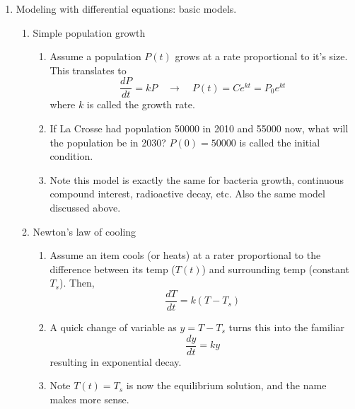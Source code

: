 \documentclass{article}
\begin{document}
\begin{enumerate}
\item Modeling with differential equations: basic models.
\begin{enumerate}

\item Simple population growth
\begin{enumerate}
\item Assume a population $P(t)$ grows at a rate proportional to it's size. This translates to
\[
\frac{dP}{dt} = k P \quad \rightarrow \quad P(t) = Ce^{kt} = P_0 e^{kt}
\]
where $k$ is called the growth rate.
\item If La Crosse had population 50000 in 2010 and 55000 now, what will the population be in 2030? $P(0)=50000$ is called the initial condition.
\item Note this model is exactly the same for bacteria growth, continuous compound interest, radioactive decay, etc. Also the same model discussed above.
\end{enumerate}
\item Newton's law of cooling
\begin{enumerate}
\item Assume an item cools (or heats) at a rater proportional to the difference between its temp ($T(t)$) and surrounding temp (constant $T_s$). Then,
\[
\frac{dT}{dt} = k(T-T_s)
\]
\item A quick change of variable as $y=T-T_s$ turns this into the familiar
\[
\frac{dy}{dt}=ky
\]
resulting in exponential decay.
\item Note $T(t)=T_s$ is now the equilibrium solution, and the name makes more sense.
\end{enumerate}


\end{enumerate}
\end{enumerate}
\end{document}
